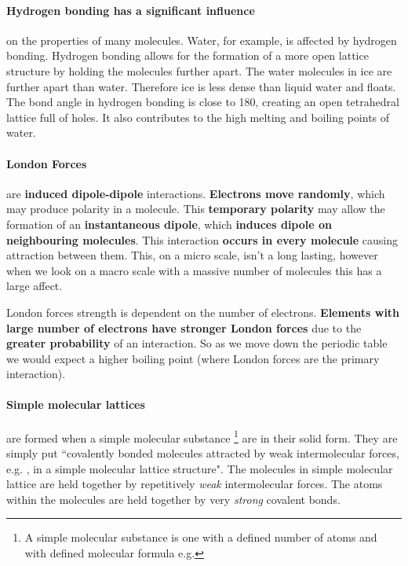 {	\paragraph{Hydrogen bonding has a significant influence} on the properties of many molecules.
	Water, for example, is affected by hydrogen bonding.
	Hydrogen bonding allows for the formation of a more open lattice structure by holding the molecules further apart. The water molecules in ice are further apart than water. Therefore ice is less dense than liquid water and floats. The bond angle in hydrogen bonding is close to 180\degree , creating an open tetrahedral lattice full of holes. It also contributes to the high melting and boiling points of water.
	
	\paragraph{London Forces} are \textbf{induced dipole-dipole} interactions.
	\textbf{Electrons move randomly}, which may produce polarity in a molecule.
	This \textbf{temporary polarity} may allow the formation of an \textbf{instantaneous dipole}, which\textbf{ induces dipole on neighbouring molecules}. 	This interaction \textbf{occurs in every molecule} causing attraction between them.
	This, on a micro scale, isn't a long lasting, however when we look on a macro scale with a massive number of molecules this has a large affect.

	London forces strength is dependent on the number of electrons.
	\textbf{Elements with large number of electrons have stronger London forces} due to the \textbf{greater probability} of an interaction.
	So as we move down the periodic table we would expect a higher boiling point (where London forces are the primary interaction).
	
	\paragraph{Simple molecular lattices} are formed when a simple molecular substance
	\footnote{A simple molecular substance is one with a defined number of atoms and with defined molecular formula e.g. } are in their solid form.
	They are simply put ``covalently bonded molecules attracted by weak intermolecular forces, e.g. , in a simple molecular lattice structure".
	The molecules in simple molecular lattice are held together by repetitively \textit{weak} intermolecular forces. The atoms within the molecules are held together by very \textit{strong} covalent bonds.
	
}
